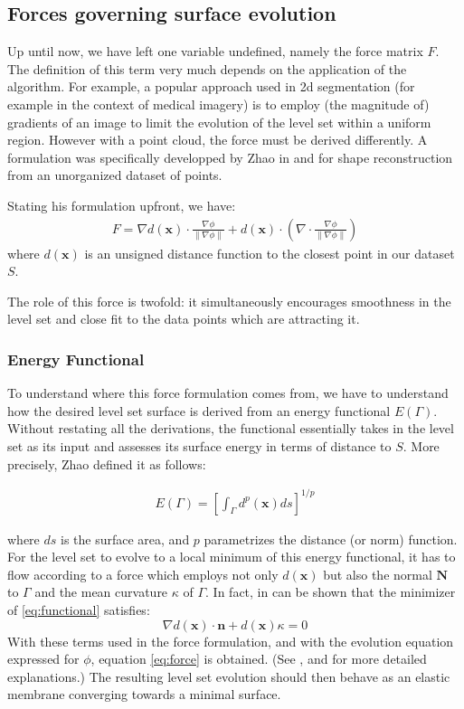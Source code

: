 \documentclass{article}
\begin{document}
\subsection{Forces governing surface evolution}

Up until now, we have left one variable undefined, namely the force matrix $F$.
The definition of this term very much depends on the application of the
algorithm. For example, a popular approach used in 2d segmentation (for example
in the context of medical imagery) is to employ (the magnitude of) gradients
of an image to limit the evolution of the level set within a uniform region.
However with a point cloud, the force must be derived differently. A formulation
was specifically developped by Zhao in \cite{zhao2000implicit} and
\cite{zhao2001fast} for shape reconstruction from an unorganized dataset of
points. 

Stating his formulation upfront, we have:
\begin{align}
    \label{eq:force}
    F = \nabla d(\mathbf{x}) \cdot \frac{\nabla \phi}{\| \nabla \phi \|}
+ d(\mathbf{x}) \cdot (\nabla \cdot \frac{\nabla \phi}{\| \nabla \phi \|} )
\end{align}
where $d(\mathbf{x})$ is an unsigned distance function to the closest point in
our dataset $S$.

The role of this force is twofold: it simultaneously encourages smoothness in
the level set and close fit to the data points which are attracting it.

\subsubsection{Energy Functional}
To understand where this force formulation comes from, we have to understand how
the desired level set surface is derived from an energy functional $E(\Gamma)$.
Without restating all the derivations, the functional essentially takes in the
level set as its input and assesses its surface energy in terms of distance to
$S$. More precisely, Zhao\cite{zhao2000implicit} defined it as follows:

\begin{align}
    \label{eq:functional}
    E(\Gamma) = [\int_\Gamma d^p(\mathbf{x}) ds]^{1/p}
\end{align}

where $ds$ is the surface area, and $p$ parametrizes the distance (or norm)
function. For the level set to evolve to a local minimum of this energy
functional, it has to flow according to a force which employs not only
$d(\mathbf{x})$ but also the normal $\mathbf{N}$ to $\Gamma$ and the mean
curvature $\kappa$ of $\Gamma$. In fact, in can be shown that the minimizer of
\eqref{eq:functional} satisfies:
\[
\nabla d(\mathbf{x}) \cdot \mathbf{n} + d(\mathbf{x}) \kappa = 0
\]
With these terms used in the force formulation, and with the evolution equation
expressed for $\phi$, equation \eqref{eq:force} is obtained. (See \cite{zhao2000implicit},
\cite{zhao2001fast} and \cite{savadjiev2003surface} for more detailed
explanations.) The resulting level set evolution should then behave as an
elastic membrane converging towards a minimal surface.
\end{document}
